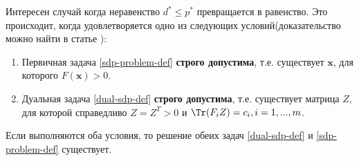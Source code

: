 Интересен случай когда неравенство $d^* \leq p^*$ превращается в равенство. Это происходит, когда удовлетворяется одно из следующих условий(доказательство можно найти в статье \cite{Nesterov}):
\begin{enumerate}
\item  Первичная задача \ref{sdp-problem-def} \textbf{строго допустима}, т.е. существует $\bm{x}$, для которого $F(\bm{x}) > 0$.
\item  Дуальная задача \ref{dual-sdp-def} \textbf{строго допустима}, т.е. существует матрица $Z$, для которой справедливо
$Z = Z^T > 0$ и $\Tr(F_iZ) = c_i, i=1, ..., m$.
\end{enumerate}
Если выполняются оба условия, то решение обеих задач  \ref{dual-sdp-def} и \ref{sdp-problem-def} существует.